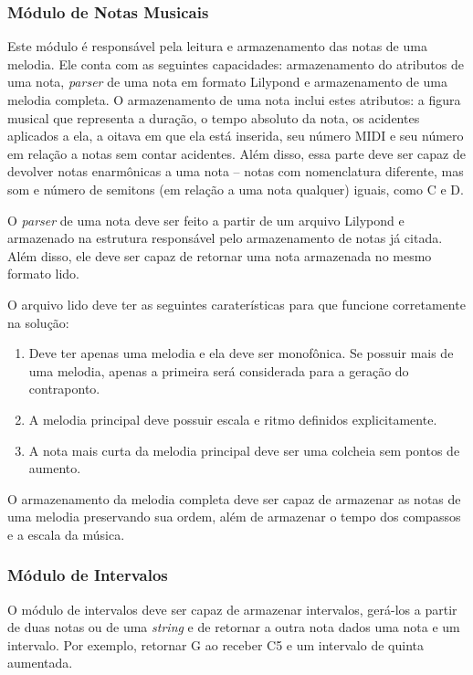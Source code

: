     \subsubsection[Módulo de Notas Musicais]{Módulo de Notas Musicais}

      Este módulo é responsável pela leitura e armazenamento das notas de uma melodia. Ele conta com as seguintes capacidades: armazenamento do atributos de uma nota, \textit{parser} de uma nota em formato Lilypond e armazenamento de uma melodia completa. O armazenamento de uma nota inclui estes atributos: a figura musical que representa a duração, o tempo absoluto da nota, os acidentes aplicados a ela, a oitava em que ela está inserida, seu número MIDI e seu número em relação a notas sem contar acidentes. Além disso, essa parte deve ser capaz de devolver notas enarmônicas a uma nota -- notas com nomenclatura diferente, mas som e número de semitons (em relação a uma nota qualquer) iguais, como C\sh{}  e D\fl.

      O \textit{parser} de uma nota deve ser feito a partir de um arquivo Lilypond e armazenado na estrutura responsável pelo armazenamento de notas já citada. Além disso, ele deve ser capaz de retornar uma nota armazenada no mesmo formato lido.

      O arquivo lido deve ter as seguintes caraterísticas para que funcione corretamente na solução:

      \begin{enumerate}
        \item Deve ter apenas uma melodia e ela deve ser monofônica. Se possuir mais de uma melodia, apenas a primeira será considerada para a geração do contraponto.
        \item A melodia principal deve possuir escala e ritmo definidos explicitamente.
        \item A nota mais curta da melodia principal deve ser uma colcheia sem pontos de aumento.
      \end{enumerate}

      O armazenamento da melodia completa deve ser capaz de armazenar as notas de uma melodia preservando sua ordem, além de armazenar o tempo dos compassos e a escala da música.

    \subsubsection[Módulo de Intervalos]{Módulo de Intervalos}

      O módulo de intervalos deve ser capaz de armazenar intervalos, gerá-los a partir de duas notas ou de uma \textit{string} e de retornar a outra nota dados uma nota e um intervalo. Por exemplo, retornar G ao receber C5 e um intervalo de quinta aumentada.

